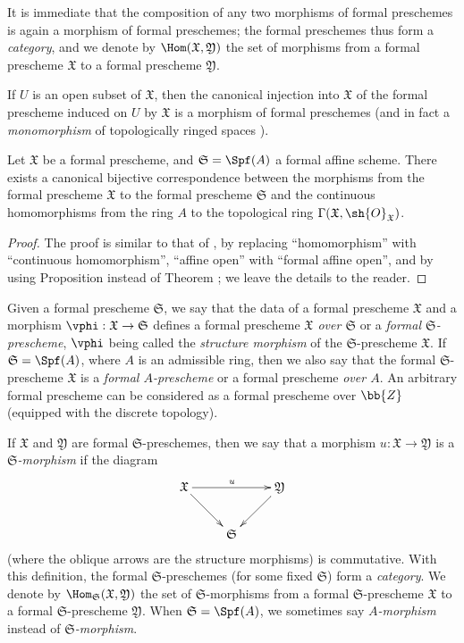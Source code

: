 It is immediate that the composition of any two morphisms of formal preschemes is again a morphism of formal preschemes; the formal preschemes thus form a \emph{category}, and we denote by $\Hom(\mathfrak{X},\mathfrak{Y})$ the set of morphisms from a formal prescheme $\mathfrak{X}$ to a formal prescheme $\mathfrak{Y}$.

If $U$ is an open subset of $\mathfrak{X}$, then the canonical injection into $\mathfrak{X}$ of the formal prescheme induced on $U$ by $\mathfrak{X}$ is a morphism of formal preschemes (and in fact a \emph{monomorphism} of topologically ringed spaces ).

\begin{proposition}[10.4.6]
\label{I.10.4.6}
Let $\mathfrak{X}$ be a formal prescheme, and $\mathfrak{S}=\Spf(A)$ a formal affine scheme.
There exists a canonical bijective correspondence between the morphisms from the formal prescheme $\mathfrak{X}$ to the formal prescheme $\mathfrak{S}$ and the continuous homomorphisms from the ring $A$ to the topological ring $\Gamma(\mathfrak{X},\sh{O}_\mathfrak{X})$.
\end{proposition}

\begin{proof}
The proof is similar to that of , by replacing ``homomorphism'' with ``continuous homomorphism'', ``affine open'' with ``formal affine open'', and by using Proposition  instead of Theorem ; we leave the details to the reader.
\end{proof}

\begin{env}[10.4.7]
\label{I.10.4.7}
Given a formal prescheme $\mathfrak{S}$, we say that the data of a formal prescheme $\mathfrak{X}$ and a morphism $\vphi:\mathfrak{X}\to\mathfrak{S}$ defines a formal prescheme \emph{$\mathfrak{X}$ over $\mathfrak{S}$} or a \emph{formal $\mathfrak{S}$-prescheme}, $\vphi$ being called the \emph{structure morphism} of the $\mathfrak{S}$-prescheme $\mathfrak{X}$.
If $\mathfrak{S}=\Spf(A)$, where $A$ is an admissible ring, then we also say that the formal $\mathfrak{S}$-prescheme $\mathfrak{X}$ is a \emph{formal $A$-prescheme} or a formal prescheme \emph{over $A$}.
An arbitrary formal prescheme can be considered as a formal prescheme over $\bb{Z}$ (equipped with the discrete topology).

If $\mathfrak{X}$ and $\mathfrak{Y}$ are formal $\mathfrak{S}$-preschemes, then we say that a morphism $u:\mathfrak{X}\to\mathfrak{Y}$ is a \emph{$\mathfrak{S}$-morphism} if the diagram
\[
  \xymatrix{
    \mathfrak{X}\ar[rr]^u\ar[rd] & &
    \mathfrak{Y}\ar[ld]\\
    & \mathfrak{S}
  }
\]
(where the oblique arrows are the structure morphisms) is commutative.
With this definition, the formal $\mathfrak{S}$-preschemes (for some fixed $\mathfrak{S}$) form a \emph{category}.
We denote by $\Hom_\mathfrak{S}(\mathfrak{X},\mathfrak{Y})$ the set of $\mathfrak{S}$-morphisms from a formal $\mathfrak{S}$-prescheme $\mathfrak{X}$ to a formal $\mathfrak{S}$-prescheme $\mathfrak{Y}$.
When $\mathfrak{S}=\Spf(A)$, we sometimes say \emph{$A$-morphism} instead of \emph{$\mathfrak{S}$-morphism}.
\end{env}

